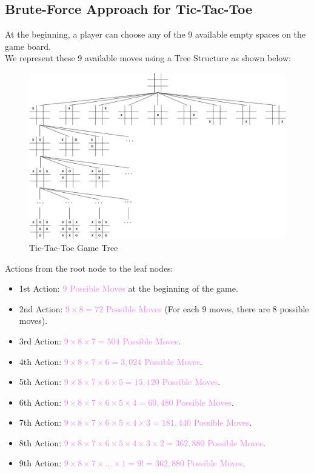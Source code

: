 \documentclass{book}
\begin{document}
\subsection{Brute-Force Approach for Tic-Tac-Toe}
At the beginning, a player can choose any of the 9 available empty spaces on the game board.\\
We represent these 9 available moves using a Tree Structure as shown below:\\
\begin{center}
    \begin{figure}[h]
        \centering
        \includegraphics[scale=0.25]{chapter 10/ch10_figure1.jpeg}
        \caption{Tic-Tac-Toe Game Tree}
    \end{figure}
\end{center}
Actions from the root node to the leaf nodes:
\begin{itemize}
    \item 1st Action: \textcolor{violet}{$9$ Possible Moves} at the beginning of the game.
    \item 2nd Action: \textcolor{violet}{$9 \times 8 = 72$ Possible Moves} (For each 9 moves, there are 8 possible moves).
    \item 3rd Action: \textcolor{violet}{$9 \times 8 \times 7 = 504$ Possible Moves}.
    \item 4th Action: \textcolor{violet}{$9 \times 8 \times 7 \times 6 = 3,024$ Possible Moves}.
    \item 5th Action: \textcolor{violet}{$9 \times 8 \times 7 \times 6 \times 5 = 15,120$ Possible Moves}.
    \item 6th Action: \textcolor{violet}{$9 \times 8 \times 7 \times 6 \times 5 \times 4 = 60,480$ Possible Moves}.
    \item 7th Action: \textcolor{violet}{$9 \times 8 \times 7 \times 6 \times 5 \times 4 \times 3 = 181,440$ Possible Moves}.
    \item 8th Action: \textcolor{violet}{$9 \times 8 \times 7 \times 6 \times 5 \times 4 \times 3 \times 2 = 362,880$ Possible Moves}.
    \item 9th Action: \textcolor{violet}{$9 \times 8 \times 7 \times \ldots \times 1 = 9! = 362,880$ Possible Moves}.
\end{itemize}
\end{document}
